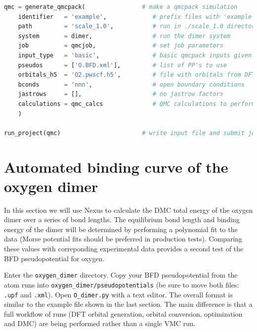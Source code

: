\begin{lstlisting}[language=Python]
qmc = generate_qmcpack(                # make a qmcpack simulation 
    identifier   = 'example',             # prefix files with 'example'
    path         = 'scale_1.0',           # run in ./scale_1.0 directory
    system       = dimer,                 # run the dimer system
    job          = qmcjob,                # set job parameters
    input_type   = 'basic',               # basic qmcpack inputs given below    
    pseudos      = ['O.BFD.xml'],         # list of PP's to use
    orbitals_h5  = 'O2.pwscf.h5',         # file with orbitals from DFT
    bconds       = 'nnn',                 # open boundary conditions
    jastrows     = [],                    # no jastrow factors
    calculations = qmc_calcs              # QMC calculations to perform
    )
                       
run_project(qmc)                       # write input file and submit job
\end{lstlisting}
\fi





\section{Automated binding curve of the oxygen dimer}
\label{sec:dimer_automation}
In this section we will use Nexus to calculate the DMC total energy of the oxygen dimer over a series of bond lengths.  The equilibrium bond length and binding energy of the dimer will be determined by performing a polynomial fit to the data (Morse potential fits should be preferred in production tests).  Comparing these values with correponding experimental data provides a second test of the BFD pseudopotential for oxygen.

Enter the \texttt{oxygen\_dimer} directory.  Copy your BFD pseudopotential from the atom runs into \texttt{oxygen\_dimer/pseudopotentials} (be sure to move both files: \texttt{.upf} and \texttt{.xml}).  Open \texttt{O\_dimer.py} with a text editor.  The overall format is similar to the example file shown in the last section.  
The main difference is that a full workflow of runs (DFT orbital generation, orbital conversion, optimization and DMC) are being performed rather than a single VMC run.  

